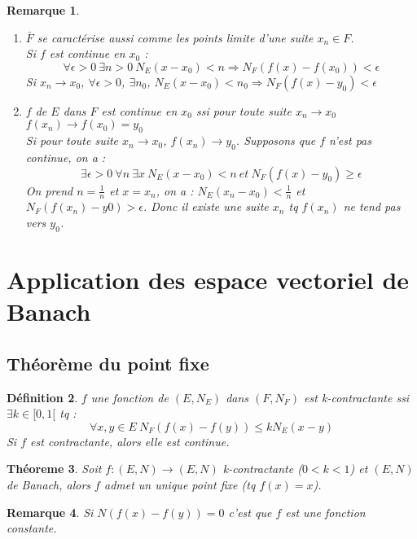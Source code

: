 \documentclass[a4paper, oneside]{report}
\theoremstyle{break}
\newtheorem{thm}{Théoreme}[section] %
\newtheorem{defi}[thm]{Définition}
\newtheorem{remar}[thm]{Remarque}
\newcommand{\ev}{espace vectoriel }
\newcommand{\fracun}[1]{\frac{1}{#1}}
\begin{document}
\begin{remar}
\begin{enumerate}
\item $\bar{F}$ se caractérise aussi comme les points limite d'une suite $x_n\in F$.\\

Si $f$ est continue en $x_0$ :
$$\forall \epsilon >0~\exists n>0~N_E(x-x_0)<n\Rightarrow N_F(f(x)-f(x_0)) < \epsilon$$
Si $x_n\rightarrow x_0$, $\forall \epsilon>0$, $\exists n_0$, $N_E(x-x_0)<n_0\Rightarrow N_F(f(x)-y_0) < \epsilon$

\item $f$ de $E$ dans $F$ est continue en $x_0$ ssi pour toute suite $x_n\rightarrow x_0$ $f(x_n)\rightarrow f(x_0)=y_0$\\

Si pour toute suite $x_n\rightarrow x_0$, $f(x_n)\rightarrow y_0$. Supposons que $f$ n'est pas continue, on a :
$$\exists \epsilon >0~\forall n~\exists x~ N_E(x-x_0)<n~et~N_F(f(x)-y_0)\geq \epsilon$$
On prend $n=\fracun{n}$ et $x=x_n$, on a : $N_E(x_n-x_0)<\fracun{n}$ et $N_F(f(x_n)-y0)>\epsilon$. Donc il existe une suite $x_n$ tq $f(x_n)$ ne tend pas vers $y_0$.

\end{enumerate}
\end{remar}


\section{Application des \ev de Banach}

\subsection{Théorème du point fixe}

\begin{defi}                    
$f$ une fonction de $(E,N_E)$ dans $(F,N_F)$ est k-contractante ssi $\exists k\in [0,1[$ tq :
$$\forall x,y\in E~N_F(f(x)-f(y))\leq kN_E(x-y)$$
Si $f$ est contractante, alors elle est continue.
\end{defi}

\begin{thm}
Soit $f:(E,N) \rightarrow (E,N)$ k-contractante ($0< k<1$) et $(E,N)$ de Banach, alors $f$ admet un unique point fixe (tq $f(x)=x$).
\end{thm}



\begin{remar}
Si $N(f(x)-f(y))=0$ c'est que $f$ est une fonction constante.
\end{remar}
\end{document}
